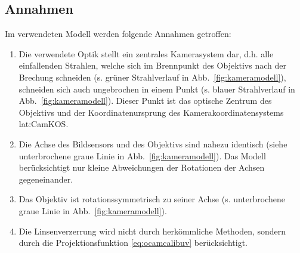 \subsection{Annahmen}
Im verwendeten Modell werden folgende Annahmen getroffen:
\begin{enumerate}
\item Die verwendete Optik stellt ein zentrales Kamerasystem dar, d.h. alle einfallenden Strahlen, welche sich im Brennpunkt des Objektivs nach der Brechung schneiden (s. grüner Strahlverlauf in Abb.~\ref{fig:kameramodell}), schneiden sich auch ungebrochen in einem Punkt (s. blauer Strahlverlauf in Abb.~\ref{fig:kameramodell}). Dieser Punkt ist das optische Zentrum des Objektivs und der Koordinatenursprung des Kamerakoordinatensystems \gls{lat:CamKOS}.
\item \label{item:ocamcalibassm2} Die Achse des Bildsensors und des Objektivs sind nahezu identisch (siehe unterbrochene graue Linie in Abb.~\ref{fig:kameramodell}). Das Modell berücksichtigt nur kleine Abweichungen der Rotationen der Achsen gegeneinander.
\item Das Objektiv ist rotationssymmetrisch zu seiner Achse (s. unterbrochene graue Linie in Abb.~\ref{fig:kameramodell}).
\item Die Linsenverzerrung wird nicht durch herkömmliche Methoden, sondern durch die Projektionsfunktion  \eqref{eq:ocamcalibuv} berücksichtigt.
\end{enumerate}

